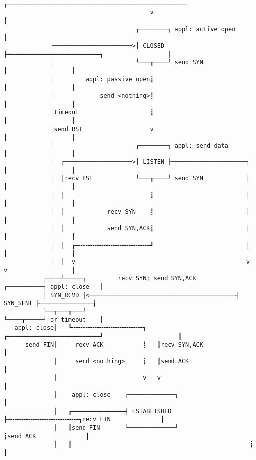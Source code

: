 \documentclass[varwidth=70em,crop]{standalone}
\begin{document}
\begin{verbatim}
                                         ┌──────────────────────────────────────────────────┐
                                         v                                                  │
                                     ┌────────┐ appl: active open                           │
             ┌──────────────────────>│ CLOSED ┝━━━━━━━━━━━━━━━━━━━━━━━━━━┓                  │
             │                       └───┰────┘ send SYN                 ┃                  │
             │         appl: passive open┋                               ┃                  │
             │             send <nothing>┋                               ┃                  │
             │timeout                    ┋                               ┃                  │
             │send RST                   v                               ┃                  │
             │                       ┌────────┐ appl: send data          ┃                  │
             │  ┌───────────────────>│ LISTEN ├─────────────────────┐    ┃                  │
             │  │recv RST            └───┰────┘ send SYN            │    ┃                  │
             │  │                        ┋                          │    ┃                  │
             │  │            recv SYN    ┋                          │    ┃                  │
             │  │            send SYN,ACK┋                          │    ┃                  │
             │  │  ┏╍╍╍╍╍╍╍╍╍╍╍╍╍╍╍╍╍╍╍╍╍┛                          │    ┃                  │
             │  │  v                                                v    v                  │
           ┌─┴──┴─────┐         recv SYN; send SYN,ACK           ┌──────────┐ appl: close   │
           │ SYN_RCVD │<─────────────────────────────────────────┤ SYN_SENT ├───────────────┧
           └──┬───┰───┘                                          └────┰─────┘ or timeout    ┃
   appl: close│   ┗╍╍╍╍╍╍╍╍╍╍╍╍╍╍╍╍╍╍╍╍┓   ┏━━━━━━━━━━━━━━━━━━━━━━━━━━┛                     ┃
      send FIN│     recv ACK           ┋   ┃recv SYN,ACK                                    ┃
              │     send <nothing>     ┋   ┃send ACK                                        ┃
              │                        v   v                                                ┃
              │    appl: close    ┌─────────────┐                                           ┃
              │   ┏━━━━━━━━━━━━━━━┥ ESTABLISHED ┝╍╍╍╍╍╍╍╍╍╍╍╍╍╍╍╍╍╍╍╍┓recv FIN              ┃
              │   ┃send FIN       └─────────────┘                    ┋send ACK              ┃
              │   ┃                                                  ┋                      ┃

\end{verbatim}
\end{document}
